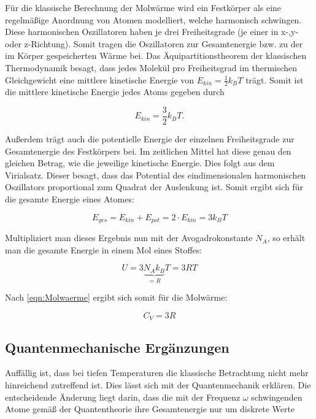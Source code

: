 Für die klassische Berechnung der Molwärme wird ein Festkörper
als eine regelmäßige Anordnung von Atomen modelliert, welche 
harmonisch schwingen. Diese harmonischen Oszillatoren haben je 
drei Freiheitsgrade (je einer in x-,y- oder z-Richtung). Somit 
tragen die Oszillatoren zur Gesamtenergie bzw. zu der im Körper
gespeicherten Wärme bei.
Das Äquipartitionstheorem der klassischen Thermodynamik besagt,
dass jedes Molekül pro Freiheitsgrad im thermischen 
Gleichgewicht eine mittlere kinetische Energie von 
$E_{kin} = \frac{1}{2} k_B T$ trägt. Somit ist die mittlere
kinetische Energie jedes Atoms gegeben durch

\begin{equation}
E_ {kin} = \frac{3}{2} k_B T.
\end{equation}

Außerdem trägt auch die potentielle Energie der einzelnen 
Freiheitsgrade zur Gesamtenergie des Festkörpers bei. 
Im zeitlichen Mittel hat diese genau den gleichen Betrag, 
wie die jeweilige kinetische Energie. Dies folgt aus dem 
Virialsatz. Dieser besagt, dass das Potential des 
eindimensionalen harmonischen Oszillators proportional zum
Quadrat der Auslenkung ist. Somit ergibt sich für die
gesamte Energie eines Atomes:

\begin{equation*}
E_{ges} = E_ {kin} + E_ {pot} = 2\cdot E_ {kin} = 3 k_B T 
\end{equation*}

Multipliziert man dieses Ergebnis nun mit der Avogadrokonstante
$N_A$, so erhält man die gesamte Energie in einem Mol eines 
Stoffes: 

\begin{equation}
U = 3\underbrace{N_A k_B}_{=R} T = 3 R T 
\label{eqn:innereEnergie}
\end{equation}

Nach \ref{eqn:Molwaerme} ergibt sich somit für die Molwärme:

\begin{equation*}
C_V = 3 R 
\end{equation*}

\subsection{Quantenmechanische Ergänzungen}
\label{sec:Quanten}

Auffällig ist, dass bei tiefen Temperaturen die klassische 
Betrachtung nicht mehr hinreichend zutreffend ist. Dies 
lässt sich mit der Quantenmechanik erklären.
Die entscheidende Änderung liegt darin, dass die mit der 
Frequenz $\omega$ schwingenden Atome gemäß der Quantentheorie
ihre Gesamtenergie nur um diskrete Werte


